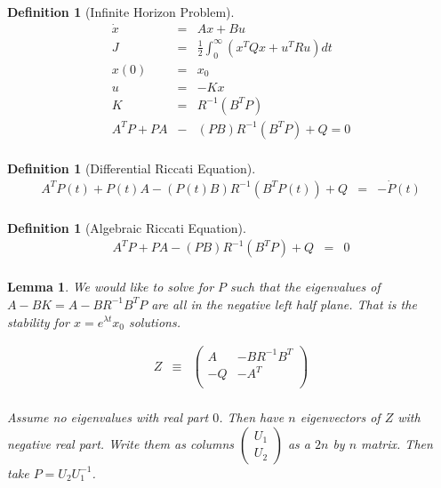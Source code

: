 \documentclass[a4paper,landscape]{article}
\theoremstyle{change}
\newtheorem{definition}[equation]{Definition}
\newtheorem{lemma}[equation]{Lemma}
\theoremstyle{nonumberplain}
\numberwithin{equation}{section}
\begin{document}
\begin{definition}[Infinite Horizon Problem]
\begin{eqnarray*}
\dot{x} &=& Ax + Bu\\
J &=& \frac{1}{2} \int_{0}^{\infty} ( x^T Q x + u^T R u  ) dt\\
x (0 ) &=& x_0\\
u &=& - K x\\
K &=& R^{-1} ( B^T P  )\\
A^T P + P A &-& ( P B ) R^{-1} ( B^T P ) + Q = 0\\
\end{eqnarray*}
\end{definition}

\begin{definition}[Differential Riccati Equation]
\begin{eqnarray*}
A^T P(t) + P(t) A - ( P(t) B ) R^{-1} ( B^T P(t) ) + Q &=& - \dot{P} (t)\\
\end{eqnarray*}
\end{definition}

\begin{definition}[Algebraic Riccati Equation]
\begin{eqnarray*}
A^T P + P A - ( P B ) R^{-1} ( B^T P ) + Q &=& 0\\
\end{eqnarray*}
\end{definition}

\begin{lemma}

We would like to solve for $P$ such that the eigenvalues of $A-BK=A-BR^{-1} B^T P$ are all in the negative left half plane. That is the stability for $x = e^{\lambda t} x_0$ solutions.

\begin{eqnarray*}
Z &\equiv& \begin{pmatrix}
A & -BR^{-1}B^T\\
-Q & -A^T\\
\end{pmatrix}\\
\end{eqnarray*}

Assume no eigenvalues with real part $0$. Then have $n$ eigenvectors of $Z$ with negative real part. Write them as columns $\begin{pmatrix}U_1\\U_2\end{pmatrix}$ as a $2n$ by $n$ matrix. Then take $P=U_2 U_1^{-1}$.

\end{lemma}
\end{document}

